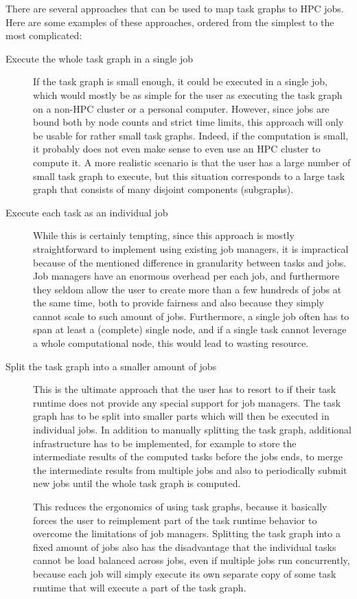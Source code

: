 There are several approaches that can be used to map task graphs to HPC jobs.
Here are some examples of these approaches, ordered from the simplest to the most complicated:

\begin{description}
    \item[Execute the whole task graph in a single job] If the task graph is small enough, it
    could be executed in a single job, which would mostly be as simple for the user as executing
    the task graph on a non-HPC cluster or a personal computer. However, since jobs are bound
    both by node counts and strict time limits, this approach will only be usable for rather
    small task graphs. Indeed, if the computation is small, it probably does not even make sense
    to even use an HPC cluster to compute it. A more realistic scenario is that the user has a
    large number of small task graph to execute, but this situation corresponds to a large task
    graph that consists of many disjoint components (subgraphs).
    \item[Execute each task as an individual job] While this is certainly tempting, since this
    approach is mostly straightforward to implement using existing job managers, it is
    impractical because of the mentioned difference in granularity between tasks and jobs.
    Job managers have an enormous overhead per each job, and furthermore they seldom allow the
    user to create more than a few hundreds of jobs at the same time, both to provide fairness and
    also because they simply cannot scale to such amount of jobs. Furthermore, a single job
    often has to span at least a (complete) single node, and if a single task cannot leverage a
    whole computational node, this would lead to wasting resource.
    \item[Split the task graph into a smaller amount of jobs] This is the ultimate approach that
    the
    user has to resort to if their task runtime does not provide any special support for job
    managers. The task graph has to be split into smaller parts which will then be executed in
    individual jobs. In addition to manually splitting the task graph, additional infrastructure
    has to be implemented, for example to store the intermediate results of the computed tasks
    before the jobs ends, to merge the intermediate results from multiple jobs and also to
    periodically submit new jobs until the whole task graph is computed.

    This reduces the ergonomics of using task graphs, because it basically forces the user to
    reimplement part of the task runtime behavior to overcome the limitations of job managers.
    Splitting the task graph into a fixed amount of jobs also has the disadvantage that the
    individual tasks cannot be load balanced across jobs, even if multiple jobs run
    concurrently, because each job will simply execute its own separate copy of some task
    runtime that will execute a part of the task graph.
\end{description}

